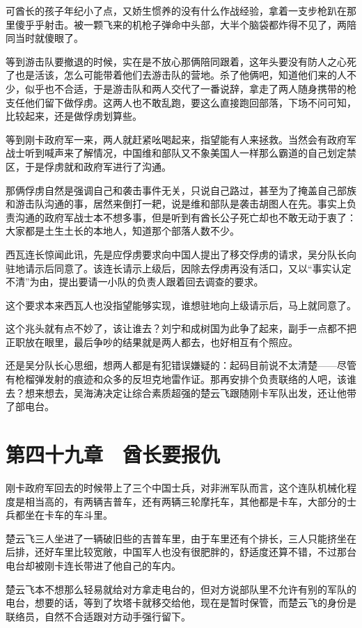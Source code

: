 可酋长的孩子年纪小了点，又娇生惯养的没有什么作战经验，拿着一支步枪趴在那里傻乎乎射击。被一颗飞来的机枪子弹命中头部，大半个脑袋都炸得不见了，两陪同当时就傻眼了。

等到游击队要撤退的时候，实在是不放心那俩陪同跟着，这年头要没有防人之心死了也是活该，怎么可能带着他们去游击队的营地。杀了他俩吧，知道他们来的人不少，似乎也不合适，于是游击队和两人交代了一番说辞，拿走了两人随身携带的枪支任他们留下做俘虏。这两人也不敢乱跑，要这么直接跑回部落，下场不问可知，比较起来，还是做俘虏划算些。

等到刚卡政府军一来，两人就赶紧吆喝起来，指望能有人来拯救。当然会有政府军战士听到喊声来了解情况，中国维和部队又不象美国人一样那么霸道的自己划定禁区，于是俘虏就和政府军进行了沟通。

那俩俘虏自然是强调自己和袭击事件无关，只说自己路过，甚至为了掩盖自己部族和游击队沟通的事，居然来倒打一耙，说是维和部队是袭击胡图人在先。事实上负责沟通的政府军战士本不想多事，但是听到有酋长公子死亡却也不敢无动于衷了：大家都是土生土长的本地人，知道那个部落人数不少。

西瓦连长惊闻此讯，先是应俘虏要求向中国人提出了移交俘虏的请求，吴分队长向驻地请示后同意了。该连长请示上级后，因除去俘虏再没有活口，又以“事实认定不清”为由，提出要请一小队的负责人跟着回去调查的要求。

这个要求本来西瓦人也没指望能够实现，谁想驻地向上级请示后，马上就同意了。

这个兆头就有点不妙了，该让谁去？刘宁和成树国为此争了起来，副手一点都不把正职放在眼里，最后争吵的结果就是两人都去，也好相互有个照应。

还是吴分队长心思细，想两人都是有犯错误嫌疑的：起码目前说不太清楚——尽管有枪榴弹发射的痕迹和众多的反坦克地雷作证。那再安排个负责联络的人吧，该谁去？想来想去，吴海涛决定让综合素质超强的楚云飞跟随刚卡军队出发，还让他带了部电台。

\section{第四十九章　酋长要报仇}

刚卡政府军回去的时候带上了三个中国士兵，对非洲军队而言，这个连队机械化程度是相当高的，有两辆吉普车，还有两辆三轮摩托车，其他都是卡车，大部分的士兵都坐在卡车的车斗里。

楚云飞三人坐进了一辆破旧些的吉普车里，由于车里还有个排长，三人只能挤坐在后排，还好车里比较宽敞，中国军人也没有很肥胖的，舒适度还算不错，不过那台电台却被刚卡连长带进了他自己的车内。

楚云飞本不想那么轻易就给对方拿走电台的，但对方说部队里不允许有别的军队的电台，想要的话，等到了坎塔卡就移交给他，现在是暂时保管，而楚云飞的身份是联络员，自然不合适跟对方动手强行留下。

